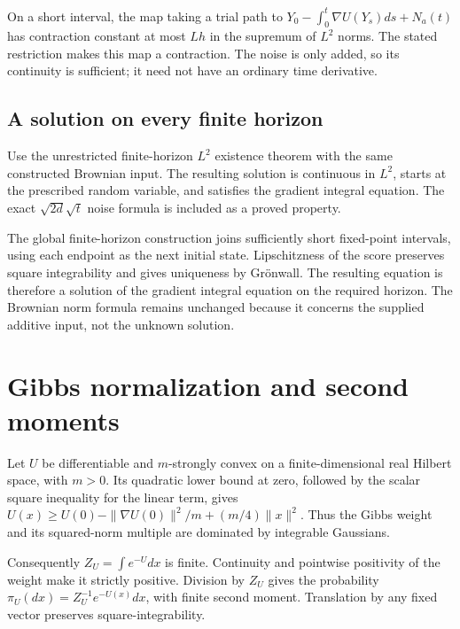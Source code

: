 \documentclass[11pt,a4paper]{report}
\begin{document}
On a short interval, the map taking a trial path to \(Y_0-\int_0^t\nabla U(Y_s)ds+N_a(t)\) has contraction constant at most \(Lh\) in the supremum of \(L^2\) norms. The stated restriction makes this map a contraction. The noise is only added, so its continuity is sufficient; it need not have an ordinary time derivative.

\subsection{\texorpdfstring{A solution on every finite horizon}{A solution on every finite horizon}}
\label{report-step-UnadjustedLangevin-BrownianLangevin-lean-6}


Use the unrestricted finite-horizon \(L^2\) existence theorem with the same constructed Brownian input. The resulting solution is continuous in \(L^2\), starts at the prescribed random variable, and satisfies the gradient integral equation. The exact \(\sqrt{2d}\sqrt t\) noise formula is included as a proved property.



The global finite-horizon construction joins sufficiently short fixed-point intervals, using each endpoint as the next initial state. Lipschitzness of the score preserves square integrability and gives uniqueness by Grönwall. The resulting equation is therefore a solution of the gradient integral equation on the required horizon. The Brownian norm formula remains unchanged because it concerns the supplied additive input, not the unknown solution.

\section{\texorpdfstring{Gibbs normalization and second moments}{Gibbs normalization and second moments}}
\label{proof-module-UnadjustedLangevin-Gibbs-lean}


Let \(U\) be differentiable and \(m\)-strongly convex on a finite-dimensional real Hilbert space, with \(m>0\). Its quadratic lower bound at zero, followed by the scalar square inequality for the linear term, gives \(U(x)\ge U(0)-\|\nabla U(0)\|^2/m+(m/4)\|x\|^2\). Thus the Gibbs weight and its squared-norm multiple are dominated by integrable Gaussians.



Consequently \(Z_U=\int e^{-U}dx\) is finite. Continuity and pointwise positivity of the weight make it strictly positive. Division by \(Z_U\) gives the probability \(\pi_U(dx)=Z_U^{-1}e^{-U(x)}dx\), with finite second moment. Translation by any fixed vector preserves square-integrability.
\end{document}
